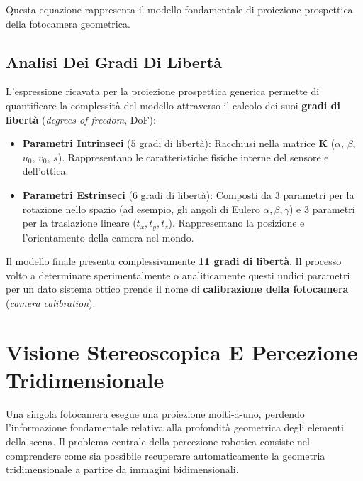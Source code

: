 ﻿\documentclass[11pt, a4paper]{article}
\begin{document}

Questa equazione rappresenta il modello fondamentale di proiezione prospettica della fotocamera geometrica.



\subsection{Analisi Dei Gradi Di Libertà}

L'espressione ricavata per la proiezione prospettica generica permette di quantificare la complessità del modello attraverso il calcolo dei suoi \textbf{gradi di libertà} (\emph{degrees of freedom}, DoF):


\begin{itemize}[noitemsep]
    \item \textbf{Parametri Intrinseci} ($5$ gradi di libertà): Racchiusi nella matrice $\bm{K}$ ($\alpha$, $\beta$, $u_0$, $v_0$, $s$). Rappresentano le caratteristiche fisiche interne del sensore e dell'ottica.
    \item \textbf{Parametri Estrinseci} ($6$ gradi di libertà): Composti da $3$ parametri per la rotazione nello spazio (ad esempio, gli angoli di Eulero $\alpha, \beta, \gamma$) e $3$ parametri per la traslazione lineare ($t_x, t_y, t_z$). Rappresentano la posizione e l'orientamento della camera nel mondo.
\end{itemize}

Il modello finale presenta complessivamente \textbf{11 gradi di libertà}. Il processo volto a determinare sperimentalmente o analiticamente questi undici parametri per un dato sistema ottico prende il nome di \textbf{calibrazione della fotocamera} (\emph{camera calibration}).

\newpage

\section{Visione Stereoscopica E Percezione Tridimensionale}

Una singola fotocamera esegue una proiezione molti-a-uno, perdendo l'informazione fondamentale relativa alla profondità geometrica degli elementi della scena. Il problema centrale della percezione robotica consiste nel comprendere come sia possibile recuperare automaticamente la geometria tridimensionale a partire da immagini bidimensionali.
\end{document}
